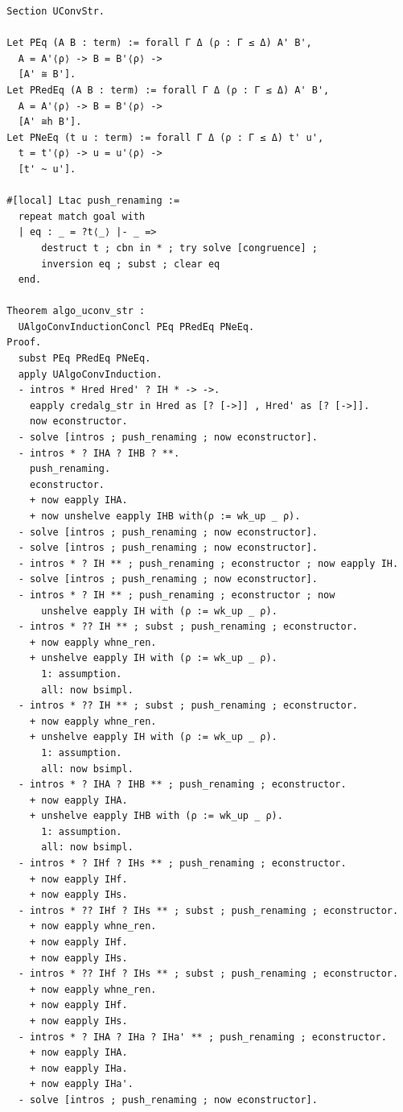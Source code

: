 \documentclass[10pt,a4paper]{amsart}
\begin{document}
\begin{lstlisting}
  Section UConvStr.
  
  Let PEq (A B : term) := forall Γ Δ (ρ : Γ ≤ Δ) A' B',
    A = A'⟨ρ⟩ -> B = B'⟨ρ⟩ ->
    [A' ≅ B'].
  Let PRedEq (A B : term) := forall Γ Δ (ρ : Γ ≤ Δ) A' B',
    A = A'⟨ρ⟩ -> B = B'⟨ρ⟩ ->
    [A' ≅h B'].
  Let PNeEq (t u : term) := forall Γ Δ (ρ : Γ ≤ Δ) t' u',
    t = t'⟨ρ⟩ -> u = u'⟨ρ⟩ ->
    [t' ~ u'].

  #[local] Ltac push_renaming :=
    repeat match goal with
    | eq : _ = ?t⟨_⟩ |- _ =>
        destruct t ; cbn in * ; try solve [congruence] ;
        inversion eq ; subst ; clear eq
    end.

  Theorem algo_uconv_str :
    UAlgoConvInductionConcl PEq PRedEq PNeEq.
  Proof.
    subst PEq PRedEq PNeEq.
    apply UAlgoConvInduction.
    - intros * Hred Hred' ? IH * -> ->.
      eapply credalg_str in Hred as [? [->]] , Hred' as [? [->]].
      now econstructor.
    - solve [intros ; push_renaming ; now econstructor].
    - intros * ? IHA ? IHB ? **.
      push_renaming.
      econstructor.
      + now eapply IHA.
      + now unshelve eapply IHB with(ρ := wk_up _ ρ).
    - solve [intros ; push_renaming ; now econstructor].
    - solve [intros ; push_renaming ; now econstructor].
    - intros * ? IH ** ; push_renaming ; econstructor ; now eapply IH.
    - solve [intros ; push_renaming ; now econstructor].
    - intros * ? IH ** ; push_renaming ; econstructor ; now
        unshelve eapply IH with (ρ := wk_up _ ρ).
    - intros * ?? IH ** ; subst ; push_renaming ; econstructor.
      + now eapply whne_ren.
      + unshelve eapply IH with (ρ := wk_up _ ρ).
        1: assumption.
        all: now bsimpl.
    - intros * ?? IH ** ; subst ; push_renaming ; econstructor.
      + now eapply whne_ren.
      + unshelve eapply IH with (ρ := wk_up _ ρ).
        1: assumption.
        all: now bsimpl.
    - intros * ? IHA ? IHB ** ; push_renaming ; econstructor.
      + now eapply IHA.
      + unshelve eapply IHB with (ρ := wk_up _ ρ).
        1: assumption.
        all: now bsimpl.
    - intros * ? IHf ? IHs ** ; push_renaming ; econstructor.
      + now eapply IHf.
      + now eapply IHs.
    - intros * ?? IHf ? IHs ** ; subst ; push_renaming ; econstructor.
      + now eapply whne_ren.
      + now eapply IHf.
      + now eapply IHs.
    - intros * ?? IHf ? IHs ** ; subst ; push_renaming ; econstructor.
      + now eapply whne_ren.
      + now eapply IHf.
      + now eapply IHs.
    - intros * ? IHA ? IHa ? IHa' ** ; push_renaming ; econstructor.
      + now eapply IHA.
      + now eapply IHa.
      + now eapply IHa'.
    - solve [intros ; push_renaming ; now econstructor].

\end{lstlisting}
\end{document}
